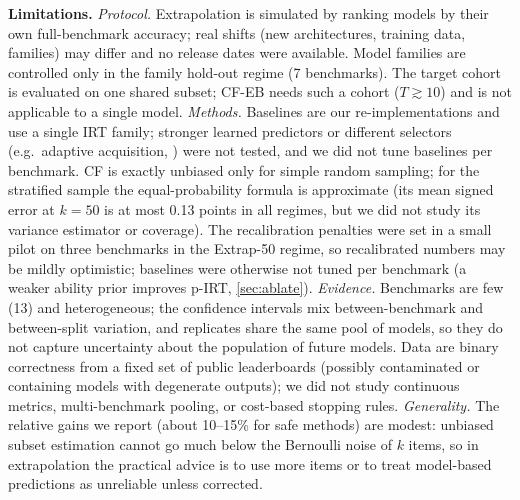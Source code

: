 \textbf{Limitations.}
\emph{Protocol.} Extrapolation is simulated by ranking models by their own full-benchmark accuracy; real shifts (new architectures, training data, families) may differ and no release dates were available. Model families are controlled only in the family hold-out regime (7 benchmarks). The target cohort is evaluated on one shared subset; CF-EB needs such a cohort ($T\gtrsim10$) and is not applicable to a single model.
\emph{Methods.} Baselines are our re-implementations and use a single IRT family; stronger learned predictors or different selectors (e.g.\ adaptive acquisition, \citealt{li2025active}) were not tested, and we did not tune baselines per benchmark. CF is exactly unbiased only for simple random sampling; for the stratified sample the equal-probability formula is approximate (its mean signed error at $k{=}50$ is at most 0.13 points in all regimes, but we did not study its variance estimator or coverage). The recalibration penalties were set in a small pilot on three benchmarks in the Extrap-50 regime, so recalibrated numbers may be mildly optimistic; baselines were otherwise not tuned per benchmark (a weaker ability prior improves p-IRT, \cref{sec:ablate}).
\emph{Evidence.} Benchmarks are few (13) and heterogeneous; the confidence intervals mix between-benchmark and between-split variation, and replicates share the same pool of models, so they do not capture uncertainty about the population of future models. Data are binary correctness from a fixed set of public leaderboards (possibly contaminated or containing models with degenerate outputs); we did not study continuous metrics, multi-benchmark pooling, or cost-based stopping rules.
\emph{Generality.} The relative gains we report (about 10--15\% for safe methods) are modest: unbiased subset estimation cannot go much below the Bernoulli noise of $k$ items, so in extrapolation the practical advice is to use more items or to treat model-based predictions as unreliable unless corrected.
